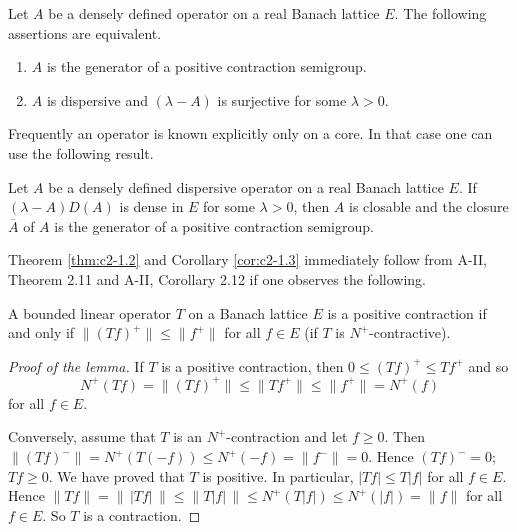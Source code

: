 \citet{phillips:1962}
\begin{theorem}\label{thm:c2-1.2}
Let $A$ be a densely defined operator on a real Banach lattice $E$. 
The following assertions are equivalent.
\begin{enumerate}[\upshape (a)]
\item \label{thm:c2-1.2-1}
$A$ is the generator of a positive contraction semigroup.
\item \label{thm:c2-1.2-2}
$A$ is dispersive and $(\lambda-A)$ is surjective for some $\lambda > 0$.
\end{enumerate}
\end{theorem}
Frequently an operator is known explicitly only on a core. In that case one can use the following result.
\begin{corollary}\label{cor:c2-1.3}
Let $A$ be a densely defined dispersive operator on a real Banach lattice $E$. 
If $(\lambda - A)D(A)$ is dense in $E$ for some $\lambda > 0$, then $A$ is closable and the closure $\overline{A}$ of $A$ is the generator of a positive contraction semigroup.
\end{corollary}
Theorem \ref{thm:c2-1.2}  and Corollary \ref{cor:c2-1.3}  immediately follow from A-II, Theorem 2.11 and A-II, Corollary 2.12  if one observes the following.
\begin{lemma}\label{lem:c2-1.4}
A bounded linear operator  $T$ on a Banach lattice $E$ is a positive contraction if and only if $\|(Tf)^{+}\| \leq \|f^{+}\|$ for all $f \in E$ (\ie if $T$ is $N^{+}$-contractive).
\end{lemma}
\begin{proof}[Proof of the lemma]
If $T$ is a positive contraction, then $0 \leq (Tf)^{+} \leq Tf^{+}$ and so 
%
\[
	N^{+}(Tf) = \|(Tf)^{+}\| \leq \|Tf^{+}\| \leq \|f^{+}\| = N^{+}(f)
\]
%
for all $f \in E$. 

Conversely, assume that $T$ is an $N^{+}$-contraction and let $f \geq 0$. 
Then $\|(Tf)^{-}\| = N^{+}(T(-f)) \leq N^{+}(-f) = \|f^{-}\| = 0$. 
Hence $(Tf)^{-} = 0$; \ie $Tf \geq 0$. 
We have proved that $T$ is positive. 
In particular, $|Tf| \leq T|f|$ for all $f \in E$. 
Hence $\|Tf\| = \|\,|Tf|\,\| \leq \|T|f|\,\| \leq N^{+}(T|f|) \leq N^{+}(|f|) = \|f\|$ for all $f \in E$. 
So $T$ is a contraction.
\end{proof}
